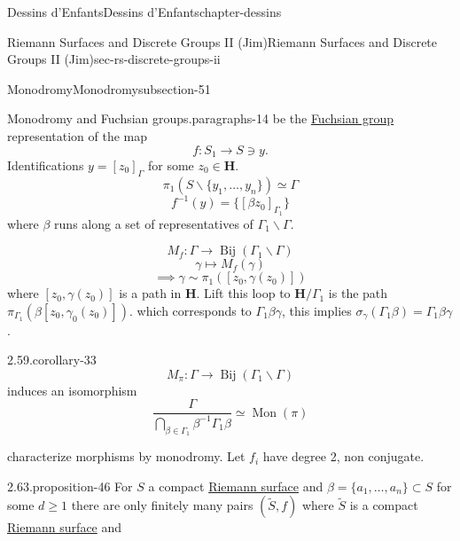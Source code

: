 \documentclass[oneside,10pt,]{book}
\numberwithin{equation}{section}
\newcommand{\inv}{^{-1}}
\newcommand{\lb}{[}
\newcommand{\rb}{]}
\newcommand{\HH}{\mathbf{H}}
\begin{document}
\begin{chapterptx}{Dessins d'Enfants}{}{Dessins d'Enfants}{}{}{chapter-dessins}
\begin{sectionptx}{Riemann Surfaces and Discrete Groups II (Jim)}{}{Riemann Surfaces and Discrete Groups II (Jim)}{}{}{sec-rs-discrete-groups-ii}
\begin{subsectionptx}{Monodromy}{}{Monodromy}{}{}{subsection-51}
\begin{paragraphs}{Monodromy and Fuchsian groups.}{paragraphs-14}
be the \hyperref[def-fuchsian-group]{Fuchsian group} representation of the map%
\begin{equation*}
f\colon S_1 \to S\ni y\text{.}
\end{equation*}
Identifications \(y = \lb z_0 \rb_\Gamma\) for some \(z_0 \in \HH\).%
\begin{equation*}
\pi_1 (S\smallsetminus \{y_1,\ldots, y_n\}) \simeq \Gamma
\end{equation*}
%
\begin{equation*}
f\inv(y ) = \{ [\beta z_0]_{\Gamma_1}\}
\end{equation*}
where \(\beta\) runs along a set of representatives of \(\Gamma_1\backslash \Gamma\).%
\par
\hypertarget{p-580}{}%
%
\begin{equation*}
M_f \colon \Gamma \to \operatorname{Bij} (\Gamma_1\backslash \Gamma)
\end{equation*}
%
\begin{equation*}
\gamma \mapsto M_f(\gamma)
\end{equation*}
%
\begin{equation*}
\implies \gamma \sim \pi_1([z_0,\gamma(z_0)])
\end{equation*}
where \(\lb z_0, \gamma(z_0) \rb\) is a path in \(\HH\). Lift this loop to \(\HH/\Gamma_1\) is the path \(\pi_{\Gamma_1}(\beta \lb z_0, \gamma_0(z_0)\rb)\). which corresponds to \(\Gamma_1 \beta \gamma\), this implies \(\sigma_\gamma(\Gamma_1\beta)  = \Gamma_1 \beta\gamma\).%
\begin{corollary}{2.59.}{}{corollary-33}%
\hypertarget{p-581}{}%
%
\begin{equation*}
M_\pi \colon \Gamma \to \operatorname{Bij} (\Gamma_1 \backslash \Gamma)
\end{equation*}
induces an isomorphism%
\begin{equation*}
\frac{\Gamma}{\bigcap_{\beta\in \Gamma_1} \beta\inv \Gamma_1 \beta} \simeq \operatorname{Mon}(\pi)
\end{equation*}
%
\end{corollary}
\hypertarget{p-582}{}%
characterize morphisms by monodromy. Let \(f_i\) have degree 2, non conjugate.%
\begin{proposition}{2.63.}{}{proposition-46}%
\hypertarget{p-583}{}%
For \(S\) a compact \hyperref[def-top-riem-surface]{Riemann surface} and \(\beta = \{ a_1, \ldots, a_n\} \subset S\) for some \(d \ge 1\) there are only finitely many pairs \((\tilde S, f)\) where \(\tilde S\) is a compact \hyperref[def-top-riem-surface]{Riemann surface} and%

\end{proposition}
\end{paragraphs}
\end{subsectionptx}
\end{sectionptx}
\end{chapterptx}
\end{document}
